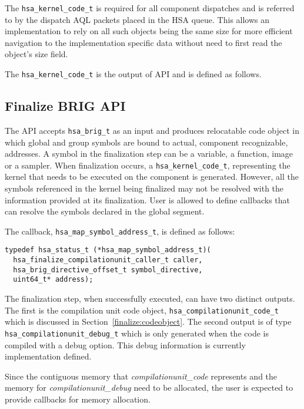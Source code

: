 The \texttt{hsa\_kernel\_code\_t} is required for all component
dispatches and is referred to by the dispatch AQL packets placed in
the HSA queue. This allows an implementation to rely on all such
objects being the same size for more efficient navigation to the
implementation specific data without need to first read the object's
size field.

The \texttt{hsa\_kernel\_code\_t} is the output of
 API and is defined as follows.



\subsection{Finalize BRIG API}
The  API accepts \texttt{hsa\_brig\_t} as
an input and produces relocatable code object in which global and
group symbols are bound to actual, component recognizable,
addresses.  A symbol in the finalization step can be a variable, a
function, image or a sampler. When finalization occurs, a
\texttt{hsa\_kernel\_code\_t}, representing the kernel that needs to
be executed on the component is generated.  However, all the symbols
referenced in the kernel being finalized may not be resolved with
the information provided at its finalization. User is allowed to
define callbacks that can resolve the symbols declared in the global
segment.

The callback, \texttt{hsa\_map\_symbol\_address\_t}, is defined as
follows:
\begin{lstlisting}
typedef hsa_status_t (*hsa_map_symbol_address_t)(
  hsa_finalize_compilationunit_caller_t caller,
  hsa_brig_directive_offset_t symbol_directive,
  uint64_t* address);
\end{lstlisting}

The finalization step, when successfully executed, can have two
distinct outputs. The first is the compilation unit code object,
\texttt{hsa\_compilationunit\_code\_t} which is discussed in
Section~\ref{finalize:codeobject}. The second output is of type
\texttt{hsa\_compilationunit\_debug\_t} which is only generated when
the code is compiled with a debug option. This debug information is
currently implementation defined.

Since the contiguous memory that {\itshape
compilationunit\_code} represents and the memory for {\itshape
compilationunit\_debug} need to be allocated, the user is expected
to provide callbacks for memory allocation. 


